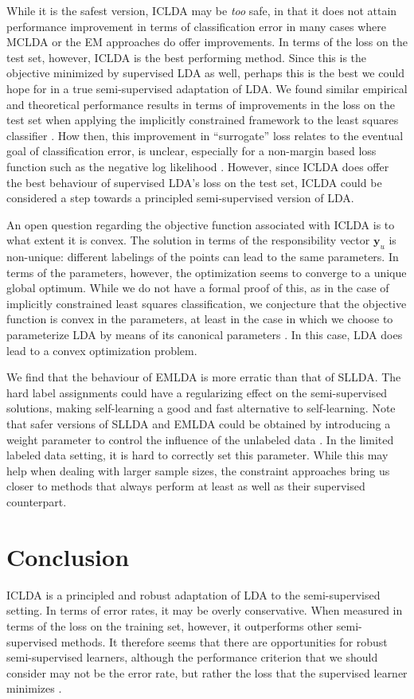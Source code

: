 \documentclass[10pt, a4paper, conference]{IEEEtran}
\begin{document}
While it is the safest version, ICLDA may be \emph{too} safe, in that it does not attain performance improvement in terms of classification error in many cases where MCLDA or the EM approaches do offer improvements. In terms of the loss on the test set, however, ICLDA is the best performing method. Since this is the objective minimized by supervised LDA as well, perhaps this is the best we could hope for in a true semi-supervised adaptation of LDA. We found similar empirical and theoretical performance results in terms of improvements in the loss on the test set when applying the implicitly constrained framework to the least squares classifier \cite{Krijthe2013}. How then, this improvement in ``surrogate'' loss relates to the eventual goal of classification error, is unclear, especially for a non-margin based loss function such as the negative log likelihood \cite{Bartlett2006}. However, since ICLDA does offer the best behaviour of supervised LDA's loss on the test set, ICLDA could be considered a step towards a principled semi-supervised version of LDA.

An open question regarding the objective function associated with ICLDA is to what extent it is convex. The solution in terms of the responsibility vector $\mathbf{y}_u$ is non-unique: different labelings of the points can lead to the same parameters. In terms of the parameters, however, the optimization seems to converge to a unique global optimum. While we do not have a formal proof of this, as in the case of implicitly constrained least squares classification, we conjecture that the objective function is convex in the parameters, at least in the case in which we choose to parameterize LDA by means of its canonical parameters \cite{Lehmann1998}.  In this case, LDA does lead to a convex optimization problem.

We find that the behaviour of EMLDA is more erratic than that of SLLDA. The hard label assignments could have a regularizing effect on the semi-supervised solutions, making self-learning a good and fast alternative to self-learning. Note that safer versions of SLLDA and EMLDA could be obtained by introducing a weight parameter to control the influence of the unlabeled data \cite{McLachlan1975}. In the limited labeled data setting, it is hard to correctly set this parameter. While this may help when dealing with larger sample sizes, the constraint approaches bring us closer to methods that always perform at least as well as their supervised counterpart. 

\section{Conclusion}
ICLDA is a principled and robust adaptation of LDA to the semi-supervised setting. In terms of error rates, it may be overly conservative. When measured in terms of the loss on the training set, however, it outperforms other semi-supervised methods. It therefore seems that there are opportunities for robust semi-supervised learners, although the performance criterion that we should consider may not be the error rate, but rather the loss that the supervised learner minimizes \cite{Loog2014b}.
\end{document}
